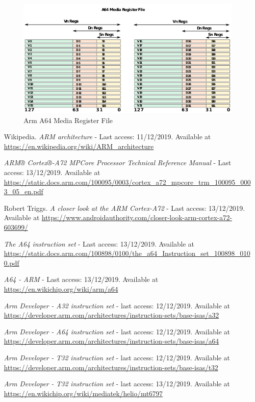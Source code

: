 \documentclass[12pt]{article}
\begin{document}
\begin{figure}[H]
\begin{center}
\includegraphics[width=1\linewidth]{imgs/a64media.png}
\caption{Arm A64 Media Register File}
\label{a64media}
\end{center}
\end{figure}



\newpage
\begin{thebibliography}{9}
Wikipedia.
\textit{ARM architecture} - Last access: 11/12/2019. Available at \url{https://en.wikipedia.org/wiki/ARM_architecture} 

\textit{ARM® Cortex®-A72 MPCore Processor Technical Reference Manual} - Last access: 13/12/2019. Available at \url{https://static.docs.arm.com/100095/0003/cortex_a72_mpcore_trm_100095_0003_05_en.pdf}
 
Robert Triggs. \textit{A closer look at the ARM Cortex-A72} - Last access: 13/12/2019. Available at \url{https://www.androidauthority.com/closer-look-arm-cortex-a72-603699/}

\textit{The A64 instruction set} - Last access: 13/12/2019. Available at \url{https://static.docs.arm.com/100898/0100/the_a64_Instruction_set_100898_0100.pdf}

\textit{A64 - ARM} - Last access: 13/12/2019. Available at \url{https://en.wikichip.org/wiki/arm/a64}

\textit{Arm Developer - A32 instruction set} - last access: 12/12/2019. Available at \url{https://developer.arm.com/architectures/instruction-sets/base-isas/a32}

\textit{Arm Developer - A64 instruction set} - last access: 12/12/2019. Available at \url{https://developer.arm.com/architectures/instruction-sets/base-isas/a64}

\textit{Arm Developer - T32 instruction set} - last access: 12/12/2019. Available at \url{https://developer.arm.com/architectures/instruction-sets/base-isas/t32}


\textit{Arm Developer - T32 instruction set} - last access: 13/12/2019. Available at \url{https://en.wikichip.org/wiki/mediatek/helio/mt6797}

\end{thebibliography}
\end{document}
